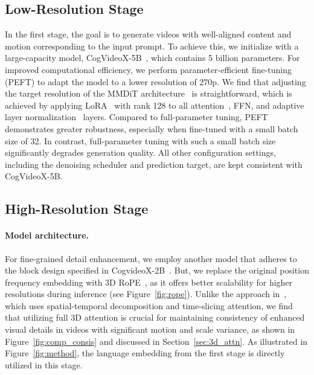 \subsection{Low-Resolution Stage }



In the first stage, the goal is to generate videos with well-aligned content and motion corresponding to the input prompt. To achieve this, we initialize with a large-capacity model, CogVideoX-5B~\citep{cogvideox}, which contains 5 billion parameters. For improved computational efficiency, we perform parameter-efficient fine-tuning (PEFT) to adapt the model to a lower resolution of 270p. We find that adjusting the target resolution of the MMDiT architecture~\citep{sd3} is straightforward, which is achieved by applying LoRA~\citep{lora} with rank 128 to all attention~\citep{attention}, FFN, and adaptive layer normalization~\citep{adaln} layers. Compared to full-parameter tuning, PEFT demonstrates greater robustness, especially when fine-tuned with a small batch size of 32. In contrast, full-parameter tuning with such a small batch size significantly degrades generation quality. All other configuration settings, including the denoising scheduler and  prediction target, are kept consistent with CogVideoX-5B.


\subsection{High-Resolution Stage }
\label{exp:stage2}



\paragraph{Model architecture.} For fine-grained detail enhancement, we employ another model that adheres to the block design specified in CogvideoX-2B~\citep{cogvideox}. But, we replace the original position frequency embedding with 3D RoPE~\citep{rope}, as it offers better scalability for higher resolutions during inference (see Figure~\ref{fig:rope}).  Unlike the approach in~\citep{venhancer}, which uses spatial-temporal decomposition and time-slicing attention, we find that utilizing full 3D attention is crucial for maintaining consistency of enhanced visual details in videos with significant motion and scale variance, as shown in Figure~\ref{fig:comp_consis} and discussed in Section~\ref{sec:3d_attn}. As illustrated in Figure~\ref{fig:method}, the language embedding from the first stage is directly utilized in this stage.


